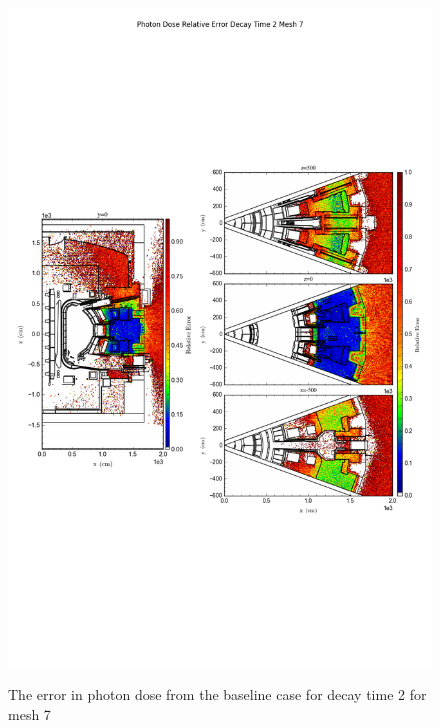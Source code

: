 \begin{figure}[ht!]
\centering
\includegraphics[trim={0cm 9cm 0cm 10cm},clip,scale=0.75]{../plots/final_model/Photon_Dose_Relative_Error_Decay_Time_2_Mesh_7.png}
\label{fig:photons_dc2_no4bc_m7_error}
\caption{The error in photon dose from the baseline case for decay time 2 for mesh 7}
\end{figure}
